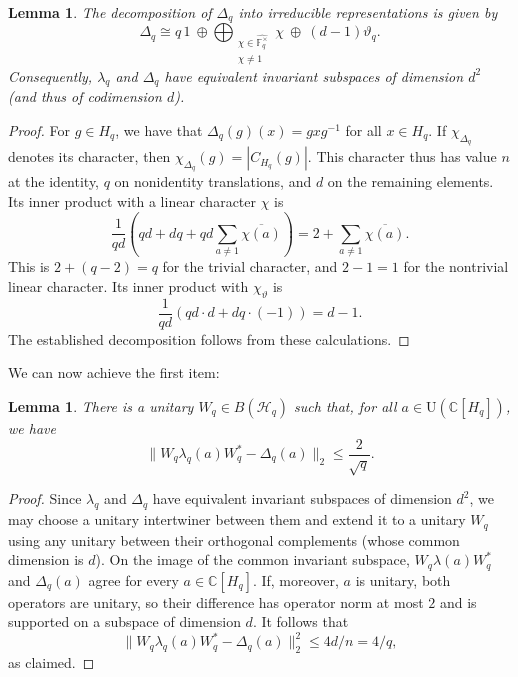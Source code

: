 \documentclass[12pt]{amsart}
\numberwithin{equation}{section}
\newtheorem{lem}[thm]{Lemma}
\theoremstyle{definition}
\def\bb{\mathbb}
\begin{document}
\begin{lem}
The decomposition of $\Delta_q$ into irreducible representations is given by
\[
 \Delta_q\cong q\,1
       \ \oplus\!\bigoplus_{\substack{\chi\in\widehat{\mathbb F_q^\times}\\
                                      \chi\ne1}}\chi
       \ \oplus\ (d-1)\vartheta_q.
\]
Consequently, $\lambda_q$ and $\Delta_q$ have equivalent invariant
subspaces of dimension $d^2$ (and thus of codimension $d$).
\end{lem}

\begin{proof}
For $g\in H_q$, we have that $\Delta_q(g)(x)=gxg^{-1}$ for all $x\in H_q$.  If $\chi_{\Delta_q}$ denotes its character, then $\chi_{\Delta_q}(g)=|C_{H_q}(g)|$.  This character thus has value $n$ at the
identity, $q$ on nonidentity translations, and $d$ on the remaining
elements.  Its inner product with a linear character $\chi$ is
\[
 \frac1{qd}\left(qd+dq+qd\sum_{a\ne1}\overline{\chi(a)}\right)
 =2+\sum_{a\ne1}\overline{\chi(a)}.
\]
This is $2+(q-2)=q$ for the trivial character, and $2-1=1$ for the
nontrivial linear character.  Its inner product with $\chi_\vartheta$ is
\[
 \frac1{qd}\left(qd\cdot d+dq\cdot(-1)\right)=d-1.
\]
The established decomposition follows from these calculations.
\end{proof}

We can now achieve the first item:

\begin{lem}
\label{aff:intertwiner}
There is a unitary $W_q\in B(\mathcal H_q)$ such that, for all $a\in \mathrm{U}(\bb C[H_q])$, we have
\begin{equation}
\label{aff:whole-algebra-intertwining}
 \|W_q\lambda_q(a)W_q^*-\Delta_q(a)\|_2
 \le\frac2{\sqrt q}.
\end{equation}
\end{lem}

\begin{proof}
Since $\lambda_q$ and $\Delta_q$ have equivalent invariant subspaces of dimension $d^2$, we may choose a unitary intertwiner
between them and extend it to a unitary $W_q$ using any unitary
between their orthogonal complements (whose common dimension is $d$).
On the image of the common invariant subspace,
$W_q\lambda(a)W_q^*$ and $\Delta_q(a)$ agree for every $a \in \bb C[H_q]$.  If, moreover, $a$ is unitary, both operators are
unitary, so their difference has operator norm at most $2$ and is
supported on a subspace of dimension $d$.  It follows that
$$\|W_q\lambda_q(a)W_q^*-\Delta_q(a)\|^2_2
 \le 4d/n=4/q,$$
as claimed.
\end{proof}
\end{document}
